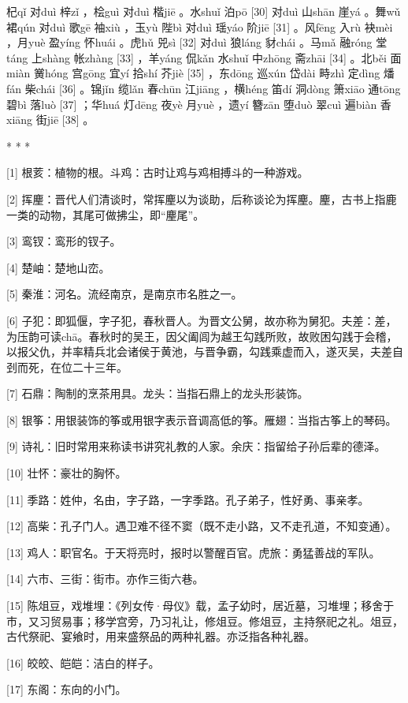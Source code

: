 \documentclass[12pt,UTF8]{ctexbook}
\begin{document}
杞qǐ 对duì 梓zǐ ，桧guì 对duì 楷jiē 。水shuǐ 泊pō [30] 对duì 山shān 崖yá 。舞wǔ 裙qún 对duì 歌gē 袖xiù ，玉yù 陛bì 对duì 瑶yáo 阶jiē [31] 。风fēng 入rù 袂mèi ，月yuè 盈yíng 怀huái 。虎hǔ 兕sì [32] 对duì 狼láng 豺chái 。马mǎ 融róng 堂táng 上shàng 帐zhàng [33] ，羊yáng 侃kǎn 水shuǐ 中zhōng 斋zhāi [34] 。北běi 面miàn 黉hóng 宫gōng 宜yí 拾shí 芥jiè [35] ，东dōng 巡xún 岱dài 畤zhì 定dìng 燔fán 柴chái [36] 。锦jǐn 缆lǎn 春chūn 江jiāng ，横héng 笛dí 洞dòng 箫xiāo 通tōng 碧bì 落luò [37] ；华huá 灯dēng 夜yè 月yuè ，遗yí 簪zān 堕duò 翠cuì 遍biàn 香xiāng 街jiē [38] 。



* * *



[1] 根荄：植物的根。斗鸡：古时让鸡与鸡相搏斗的一种游戏。

[2] 挥麈：晋代人们清谈时，常挥麈以为谈助，后称谈论为挥麈。麈，古书上指鹿一类的动物，其尾可做拂尘，即“麈尾”。

[3] 鸾钗：鸾形的钗子。

[4] 楚岫：楚地山峦。

[5] 秦淮：河名。流经南京，是南京市名胜之一。

[6] 子犯：即狐偃，字子犯，春秋晋人。为晋文公舅，故亦称为舅犯。夫差：差，为压韵可读chā。春秋时的吴王，因父阖闾为越王勾践所败，故败困勾践于会稽，以报父仇，并率精兵北会诸侯于黄池，与晋争霸，勾践乘虚而入，遂灭吴，夫差自刭而死，在位二十三年。

[7] 石鼎：陶制的烹茶用具。龙头：当指石鼎上的龙头形装饰。

[8] 银筝：用银装饰的筝或用银字表示音调高低的筝。雁翅：当指古筝上的琴码。

[9] 诗礼：旧时常用来称读书讲究礼教的人家。余庆：指留给子孙后辈的德泽。

[10] 壮怀：豪壮的胸怀。

[11] 季路：姓仲，名由，字子路，一字季路。孔子弟子，性好勇、事亲孝。

[12] 高柴：孔子门人。遇卫难不径不窦（既不走小路，又不走孔道，不知变通）。

[13] 鸡人：职官名。于天将亮时，报时以警醒百官。虎旅：勇猛善战的军队。

[14] 六市、三街：街市。亦作三街六巷。

[15] 陈俎豆，戏堆埋：《列女传·母仪》载，孟子幼时，居近墓，习堆埋；移舍于市，又习贸易事；移学宫旁，乃习礼让，修俎豆。修俎豆，主持祭祀之礼。俎豆，古代祭祀、宴飨时，用来盛祭品的两种礼器。亦泛指各种礼器。

[16] 皎皎、皑皑：洁白的样子。

[17] 东阁：东向的小门。
\end{document}
